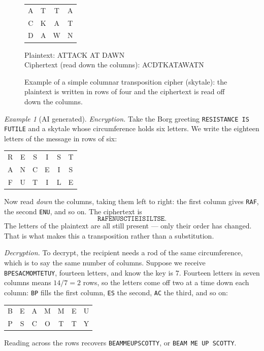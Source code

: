 \documentclass{article}
\theoremstyle{plain}
\theoremstyle{definition}
\theoremstyle{remark}
\newtheorem{example}[theorem]{Example}
\numberwithin{theorem}{section}
\newcommand{\bespokedemo}[1]{\href{bespoke:#1}{\textsf{[\,interactive: #1\,]}}}
\newif\ifweb \webfalse
\DeclareRobustCommand{\webonly}[1]{\ifweb#1\fi}
\DeclareRobustCommand{\printonly}[1]{\ifweb\else#1\fi}
\begin{document}
\begin{figure}
\begin{center}
\printonly{%
 \begin{tabular}{cccc}
   A & T & T & A \\
   C & K & A & T \\
   D & A & W & N \\
 \end{tabular}
 \vspace{1em}

 Plaintext:  ATTACK AT DAWN \\
 Ciphertext (read down the columns):  ACDTKATAWATN
}%
\webonly{\bespokedemo{transposition-demo}}
\end{center}
\caption{Example of a simple columnar transposition cipher (skytale):  the plaintext is written in rows of four and the ciphertext is read off down the columns.\webonly{  Hover any letter to trace it through the grid.}}
\label{fig:transposition-example}
\end{figure}

\webonly{\bespokedemo{transposition-tool}}

\begin{example}[AI generated]
\emph{Encryption.}  Take the Borg greeting \texttt{RESISTANCE IS FUTILE} and a skytale whose circumference holds six letters.  We write the eighteen letters of the message in rows of six:
\begin{center}
\begin{tabular}{cccccc}
  R & E & S & I & S & T \\
  A & N & C & E & I & S \\
  F & U & T & I & L & E \\
\end{tabular}
\end{center}
Now read \emph{down} the columns, taking them left to right:  the first column gives \texttt{RAF}, the second \texttt{ENU}, and so on.  The ciphertext is
\[
	\texttt{RAFENUSCTIEISILTSE}.
\]
The letters of the plaintext are all still present --- only their order has changed.  That is what makes this a transposition rather than a substitution.

\emph{Decryption.}  To decrypt, the recipient needs a rod of the same circumference, which is to say the same number of columns.  Suppose we receive \texttt{BPESACMOMTETUY}, fourteen letters, and know the key is $7$.  Fourteen letters in seven columns means $14/7 = 2$ rows, so the letters come off two at a time down each column:  \texttt{BP} fills the first column, \texttt{ES} the second, \texttt{AC} the third, and so on:
\begin{center}
\begin{tabular}{ccccccc}
  B & E & A & M & M & E & U \\
  P & S & C & O & T & T & Y \\
\end{tabular}
\end{center}
Reading across the rows recovers \texttt{BEAMMEUPSCOTTY}, or \texttt{BEAM ME UP SCOTTY}.
\end{example}
\end{document}
